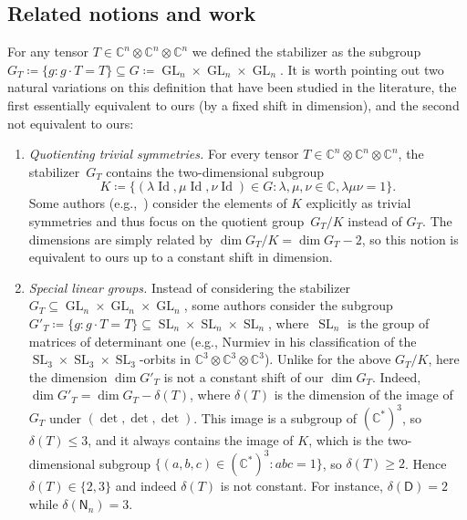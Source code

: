 \documentclass[11pt,a4paper]{article}
\numberwithin{equation}{section}
\newcommand{\CC}{\mathbb{C}}
\DeclareMathOperator{\GL}{GL}
\DeclareMathOperator{\SL}{SL}
\DeclareMathOperator{\id}{Id}
\begin{document}
%

\subsection{Related notions and work}
\label{rem:conventions}
For any tensor $T \in \CC^n \otimes \CC^n \otimes \CC^n$ we defined the stabilizer as the subgroup $G_T \coloneqq\{ g : g\cdot T = T \} \subseteq G \coloneqq \GL_n  \times \GL_n \times \GL_n$. It is worth pointing out two natural variations on this definition that have been studied in the literature, the first essentially equivalent to ours (by a fixed shift in dimension), and the second not equivalent to ours:

\begin{enumerate}[(1)]
\item 
\emph{Quotienting trivial symmetries.}
For every tensor $T \in \CC^n \otimes \CC^n \otimes \CC^n$, the stabilizer~$G_T$ contains the two-dimensional subgroup 
\[
K \coloneqq \{(\lambda \id, \mu \id, \nu \id) \in G : \lambda,\mu,\nu \in \CC, \lambda\mu\nu = 1\}.
\]
%
Some authors (e.g.,~\cite{conner2021tensorsmaximalsymmetries, MR3729273}) consider the elements of $K$ explicitly as trivial symmetries and thus focus on the quotient group~$G_T / K$ instead of $G_T$. 
The dimensions are simply related by $\dim G_T / K = \dim G_T - 2$, so this notion is equivalent to ours up to a constant shift in dimension.

%

\item
\emph{Special linear groups.}
Instead of considering the stabilizer $G_T \subseteq \GL_n \times \GL_n \times \GL_n$, some authors consider the subgroup $G'_T \coloneqq \{g : g\cdot T = T\} \subseteq \SL_n \times \SL_n \times \SL_n$, where~$\SL_n$ is the group of matrices of determinant one
%
(e.g., Nurmiev \cite{MR1773770, MR1781073} in his classification of the $\SL_3 \times \SL_3 \times \SL_3$-orbits in $\CC^3 \otimes \CC^3 \otimes \CC^3$). Unlike for the above $G_T / K$, here the dimension $\dim G'_T$ is not a constant shift of our $\dim G_T$. Indeed, $\dim G'_T = \dim G_T - \delta(T)$, where $\delta(T)$ is the dimension of the image of $G_T$ under $(\det, \det, \det)$. This image is a subgroup of $(\CC^*)^3$, so $\delta(T) \leq 3$, and it always contains the image of $K$, which is the two-dimensional subgroup $\{(a,b,c) \in (\CC^*)^3 : abc = 1\}$, so $\delta(T) \geq 2$. Hence $\delta(T) \in \{2,3\}$ and indeed $\delta(T)$ is not constant. For instance, $\delta(\mathsf{D}) = 2$ while $\delta(\mathsf{N}_n) = 3$. %
\end{enumerate}
%
\end{document}
